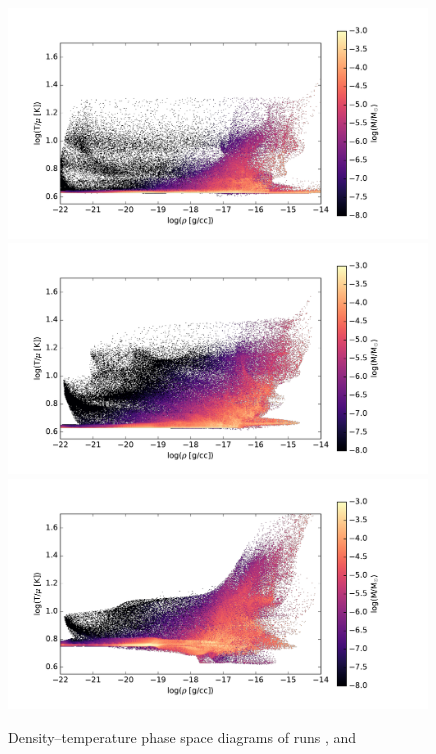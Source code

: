 \begin{figure}[!htb]
 \centering
 \includegraphics[width=0.99\textwidth]{Figures/var_rt_larson_plots/rho_temp_hist_n100c10}
 \includegraphics[width=0.99\textwidth]{Figures/var_rt_larson_plots/rho_temp_hist_n10c10}
 \includegraphics[width=0.99\textwidth]{Figures/var_rt_larson_plots/rho_temp_hist_n1c10}
 \captionsetup{justification=justified,singlelinecheck=false,width=\linewidth}
 \decoRule
 \caption[ $\rho$--T phase diagrams]{Density--temperature phase space diagrams of runs ,  and }
\label{fig:c10.0_r_t_larson}
\end{figure}
\FloatBarrier


